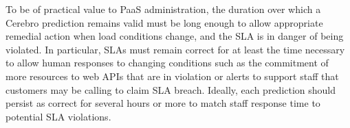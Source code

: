 %




To be of practical value to PaaS administration, the duration over which a
Cerebro prediction remains valid must be long enough to allow appropriate
remedial action when load conditions change, and the SLA is in danger of being
violated.  In particular, SLAs must remain correct for at least the time
necessary to allow human responses to changing conditions such as
the commitment of more resources to web APIs that are in violation or alerts
to support staff that customers may be calling to claim SLA breach.  Ideally,
each prediction should persist as correct for several hours or more to match
staff response time to potential SLA violations.

